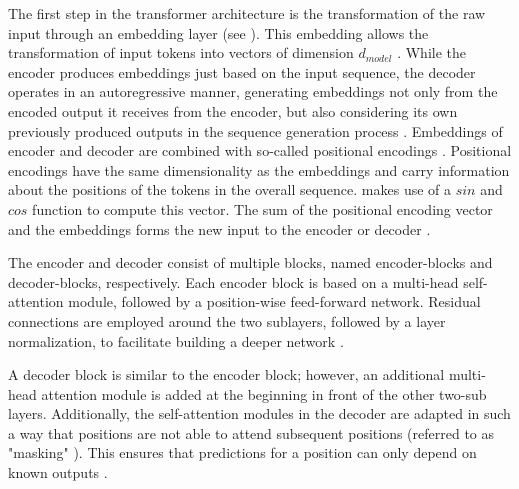 The first step in the transformer architecture is the transformation of the raw input through an embedding layer (see ).
This embedding allows the transformation of input tokens into vectors of dimension $d_{model}$ \cite{vaswani2017AttentionAllYou}.
While the encoder produces embeddings just based on the input sequence, the decoder operates in an autoregressive manner, generating embeddings not only from the encoded output it receives from the encoder, but also considering its own previously produced outputs in the sequence generation process \cite{vaswani2017AttentionAllYou}.
Embeddings of encoder and decoder are combined with so-called positional encodings \cite{vaswani2017AttentionAllYou, lin2022SurveyTransformers}.
Positional encodings have the same dimensionality as the embeddings and carry information about the positions of the tokens in the overall sequence.
\cite{vaswani2017AttentionAllYou} makes use of a $sin$ and $cos$ function to compute this vector.
The sum of the positional encoding vector and the embeddings forms the new input to the encoder or decoder \cite{vaswani2017AttentionAllYou}.

The encoder and decoder consist of multiple blocks, named encoder-blocks and decoder-blocks, respectively.
Each encoder block is based on a multi-head self-attention module, followed by a position-wise feed-forward network.
Residual connections are employed around the two sublayers, followed by a layer normalization, to facilitate building a deeper network \cite{vaswani2017AttentionAllYou, lin2022SurveyTransformers}.

A decoder block is similar to the encoder block; however, an additional multi-head attention module is added at the beginning in front of the other two-sub layers.
Additionally, the self-attention modules in the decoder are adapted in such a way that positions are not able to attend subsequent positions (referred to as "masking" \cite[p. 3]{vaswani2017AttentionAllYou}).
This ensures that predictions for a position can only depend on known outputs \cite{vaswani2017AttentionAllYou, lin2022SurveyTransformers}.

